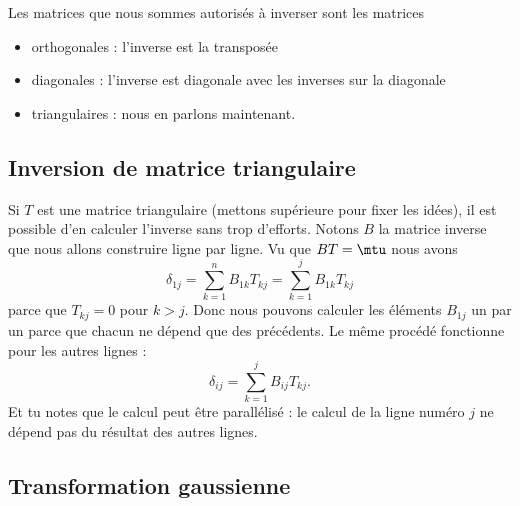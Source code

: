 Les matrices que nous sommes autorisés à inverser sont les matrices
\begin{itemize}
	\item orthogonales : l'inverse est la transposée
	\item diagonales : l'inverse est diagonale avec les inverses sur la diagonale
	\item triangulaires : nous en parlons maintenant.
\end{itemize}

\subsection{Inversion de matrice triangulaire}

Si \( T\) est une matrice triangulaire (mettons supérieure pour fixer les idées), il est possible d'en calculer l'inverse sans trop d'efforts. Notons \( B\) la matrice inverse que nous allons construire ligne par ligne. Vu que \( BT=\mtu\) nous avons
\begin{equation}
	\delta_{1j}=\sum_{k=1}^nB_{1k}T_{kj}=\sum_{k=1}^jB_{1k}T_{kj}
\end{equation}
parce que \( T_{kj}=0\) pour \( k>j\). Donc nous pouvons calculer les éléments \( B_{1j} \) un par un parce que chacun ne dépend que des précédents. Le même procédé fonctionne pour les autres lignes :
\begin{equation}
	\delta_{ij}=\sum_{k=1}^jB_{ij}T_{kj}.
\end{equation}
Et tu notes que le calcul peut être parallélisé : le calcul de la ligne numéro \( j\) ne dépend pas du résultat des autres lignes.

\subsection{Transformation gaussienne}

